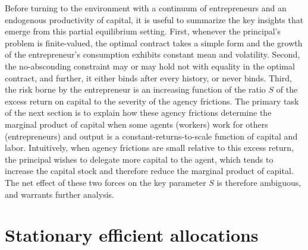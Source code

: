 \documentclass[11pt]{article}
\theoremstyle{plain}
\theoremstyle{definition} %
\begin{document}
Before turning to the environment with a continuum of entrepreneurs and an endogenous productivity of capital, it is useful to summarize the key insights that emerge from this partial equilibrium setting. First, whenever the principal's problem is finite-valued, the optimal contract takes a simple form and the growth of the entrepreneur's consumption exhibits constant mean and volatility. Second, the no-absconding constraint may or may hold not with equality in the optimal contract, and further, it either binds after every history, or never binds. Third, the risk borne by the entrepreneur is an increasing function of the ratio $S$ of the excess return on capital to the severity of the agency frictions. The primary task of the next section is to explain how these agency frictions determine the marginal product of capital when some agents (workers) work for others (entrepreneurs) and output is a constant-returns-to-scale function of capital and labor. Intuitively, when agency frictions are small relative to this excess return, the principal wishes to delegate more capital to the agent, which tends to increase the capital stock and therefore reduce the marginal product of capital. The net effect of these two forces on the key parameter $S$ is therefore ambiguous, and warrants further analysis.

\section{Stationary efficient allocations} \label{STATsection}
\end{document}
